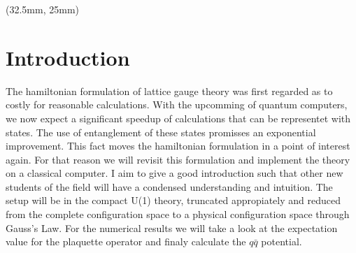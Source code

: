 \iffalse
\abstract{
	\section{Introduction}
The hamiltonian formulation of lattice gauge theory was first regarded as to costly for reasonable calculations. With the upcomming of quantum computers, we now expect a significant speedup of calculations that can be representet with states. The use of entanglement of these states promisses an exponential improvement. This fact moves the hamiltonian formulation in a point of interest again. For that reason we will revisit this formulation and implement the theory on a classical computer.
I aim to give a good introduction such that other new students of the field will have a condensed understanding and intuition. The setup will be in the compact U(1) theory, pure gauge, truncated appropiately and reduced from the complete configuration space to a physical configuration subspace through Gauss's Law.
For the numerical results we will take a look at the expectation value for the plaquette operator and finaly calculate the $q\bar{q}$ potential.
}
\fi

\begin{textblock*}{140mm}(32.5mm, 25mm)
	\section{Introduction}
				The hamiltonian formulation of lattice gauge theory was first regarded as to costly for reasonable calculations. With the upcomming of quantum computers, we now expect a significant speedup of calculations that can be representet with states. The use of entanglement of these states promisses an exponential improvement. This fact moves the hamiltonian formulation in a point of interest again. For that reason we will revisit this formulation and implement the theory on a classical computer.
I aim to give a good introduction such that other new students of the field will have a condensed understanding and intuition. The setup will be in the compact U(1) theory, truncated appropiately and reduced from the complete configuration space to a physical configuration space through Gauss's Law.
For the numerical results we will take a look at the expectation value for the plaquette operator and finaly calculate the $q\bar{q}$ potential.
\end{textblock*}

